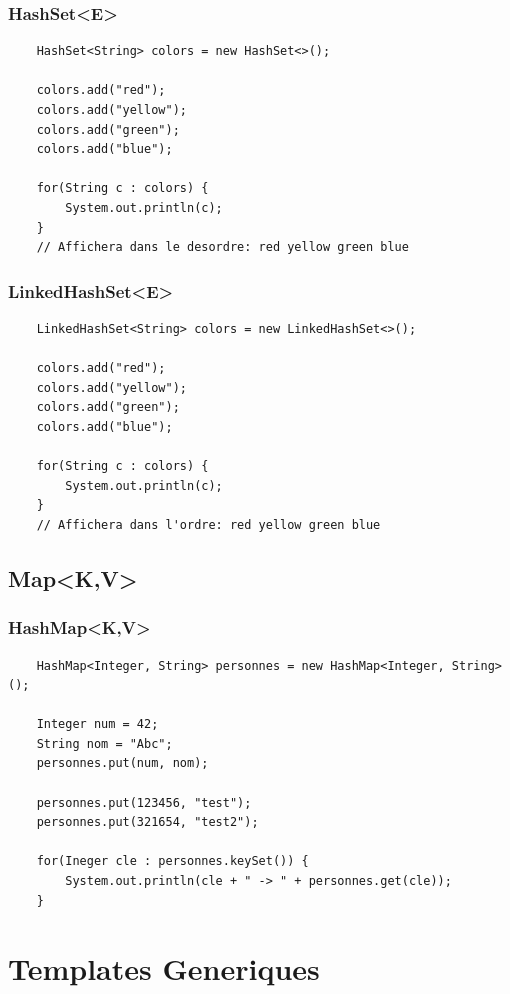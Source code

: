 \documentclass[a4paper, 12pt, french]{article}
\begin{document}
	\subsubsection{HashSet<E>}

	\begin{lstlisting}
	HashSet<String> colors = new HashSet<>();

	colors.add("red");
	colors.add("yellow");
	colors.add("green");
	colors.add("blue");

	for(String c : colors) {
		System.out.println(c);
	}
	// Affichera dans le desordre: red yellow green blue
	\end{lstlisting}

	\subsubsection{LinkedHashSet<E>}

	\begin{lstlisting}
	LinkedHashSet<String> colors = new LinkedHashSet<>();

	colors.add("red");
	colors.add("yellow");
	colors.add("green");
	colors.add("blue");

	for(String c : colors) {
		System.out.println(c);
	}
	// Affichera dans l'ordre: red yellow green blue
	\end{lstlisting}

	\subsection{Map<K,V>}

	\subsubsection{HashMap<K,V>}

	\begin{lstlisting}
	HashMap<Integer, String> personnes = new HashMap<Integer, String>();

	Integer num = 42;
	String nom = "Abc";
	personnes.put(num, nom);

	personnes.put(123456, "test");
	personnes.put(321654, "test2");

	for(Ineger cle : personnes.keySet()) {
		System.out.println(cle + " -> " + personnes.get(cle));
	}
	\end{lstlisting}

	\section{Templates Generiques}
\end{document}
